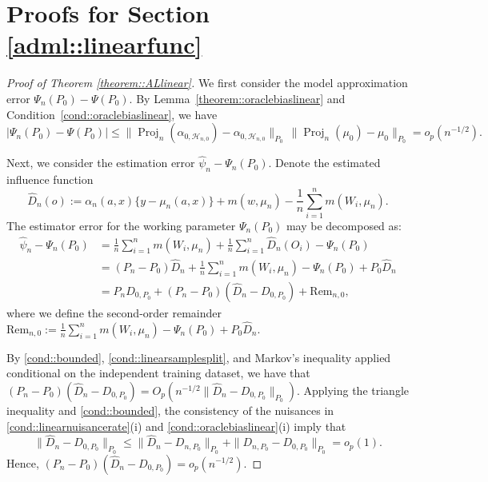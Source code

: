\documentclass[11pt]{article}
\theoremstyle{definition}
\begin{document}
\section{Proofs for Section \ref{adml::linearfunc}}
\begin{proof}[Proof of Theorem \ref{theorem::ALlinear}]
 

We first consider the model approximation error $\Psi_n(P_0) - \Psi(P_0)$. By Lemma~\ref{theorem::oraclebiaslinear} and Condition~\ref{cond::oraclebiaslinear}, we have
\[
|\Psi_n(P_0) - \Psi(P_0)| \leq \|\operatorname{Proj}_n (\alpha_{0,\mathcal{H}_{n,0}}) - \alpha_{0,\mathcal{H}_{n,0}}\|_{P_0}\, \|\operatorname{Proj}_n(\mu_0) - \mu_0\|_{P_0} = o_p(n^{-1/2}).
\]

Next, we consider the estimation error $\widehat{\psi}_n - \Psi_n(P_0)$.
 Denote the estimated influence function 
$$\widehat{D}_n(o) := \alpha_n(a,x)\{y - \mu_n(a,x)\} + m(w, \mu_n) - \frac{1}{n} \sum_{i=1}^n m(W_i, \mu_n).$$ The estimator error for the working parameter $\Psi_n(P_0)$ may be decomposed as:
\begin{align*}
    \widehat{\psi}_n  - \Psi_n(P_0) &= \frac{1}{n} \sum_{i=1}^n m(W_i, \mu_n) + \frac{1}{n} \sum_{i=1}^n  \widehat{D}_n(O_i) - \Psi_n(P_0) \\
    &= (P_n - P_0) \widehat{D}_n + \frac{1}{n} \sum_{i=1}^n m(W_i, \mu_n)  - \Psi_n(P_0) + P_0 \widehat{D}_n\\
      &= P_n D_{0, P_0} + (P_n - P_0) (\widehat{D}_n - D_{0, P_0}) + \text{Rem}_{n,0},
\end{align*}
where we define the second-order remainder $\text{Rem}_{n,0} := \frac{1}{n} \sum_{i=1}^n m(W_i, \mu_n)  - \Psi_n(P_0) + P_0 \widehat{D}_n$. 

By \ref{cond::bounded}, \ref{cond::linearsamplesplit}, and Markov's inequality applied conditional on the independent training dataset, we have that $ (P_n - P_0) (\widehat{D}_n - D_{0, P_0}) =  O_p(n^{-1/2}\|\widehat{D}_n - D_{0, P_0}\|_{P_0})$. Applying the triangle inequality and \ref{cond::bounded}, the consistency of the nuisances in \ref{cond::linearnuisancerate}(i) and \ref{cond::oraclebiaslinear}(i) imply that 
$$\|\widehat{D}_n - D_{0, P_0}\|_{P_0} \leq \|\widehat{D}_n - D_{n, P_0}\|_{P_0} + \|D_{n, P_0} - D_{0, P_0}\|_{P_0} = o_p(1).$$
Hence, $ (P_n - P_0) (\widehat{D}_n - D_{0, P_0}) =  o_p(n^{-1/2}).$ 


\end{proof}
\end{document}
